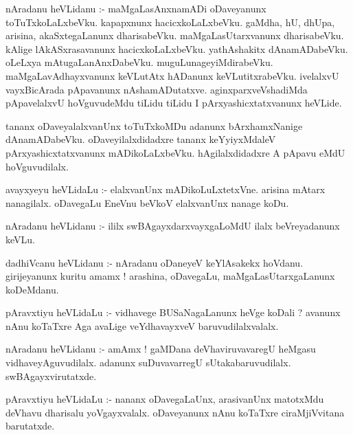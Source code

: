 \documentclass{article}
\begin{document}
\begin{mn}
nAradanu  heVLidanu :- maMgaLasAnxnamADi  oDaveyanunx  toTuTxkoLaLxbeVku.  kapapxnunx  hacicxkoLaLxbeVku.  gaMdha,  
hU,  dhUpa,  arisina,  akaSxtegaLanunx  dharisabeVku.  maMgaLasUtarxvanunx  dharisabeVku.  kAlige  lAkASxrasavanunx  
hacicxkoLaLxbeVku.  yathAshakitx  dAnamADabeVku.  oLeLxya  mAtugaLanAnxDabeVku.  muguLunageyiMdirabeVku.  maMgaLavAdhayxvanunx  
keVLutAtx  hADanunx  keVLutitxrabeVku.  ivelalxvU  vayxBicArada  pApavanunx  nAshamADutatxve.  aginxparxveVshadiMda  pApavelalxvU  
hoVguvudeMdu  tiLidu  tiLidu  I  pArxyashicxtatxvanunx  heVLide.                                                                                                
\end{mn}

\begin{mn}
tananx  oDaveyalalxvanUnx  toTuTxkoMDu  adanunx  bArxhamxNanige  dAnamADabeVku.  oDaveyilalxdidadxre  tananx  
keYyiyxMdaleV  pArxyashicxtatxvanunx  mADikoLaLxbeVku.  hAgilalxdidadxre  A  pApavu  eMdU  hoVguvudilalx.
\end{mn}

\begin{mn}
avayxyeyu  heVLidaLu :- elalxvanUnx  mADikoLuLxtetxVne.  arisina  mAtarx  nanagilalx.  oDavegaLu  EneVnu  beVkoV  
elalxvanUnx  nanage  koDu. 
\end{mn}

\begin{mn}
nAradanu  heVLidanu :- ililx  swBAgayxdarxvayxgaLoMdU  ilalx  beVreyadanunx  keVLu.
\end{mn}

\begin{mn}
dadhiVcanu  heVLidanu :- nAradanu  oDaneyeV  keYlAsakekx  hoVdanu.  girijeyanunx  kuritu  amamx !  
arashina,  oDavegaLu,  maMgaLasUtarxgaLanunx  koDeMdanu.
\end{mn}

\begin{mn}
pAravxtiyu  heVLidaLu :- vidhavege  BUSaNagaLanunx  heVge  koDali ?  avanunx  nAnu  koTaTxre  
Aga  avaLige  veYdhavayxveV  baruvudilalxvalalx. 
\end{mn}

\begin{mn}
nAradanu  heVLidanu :- amAmx !  gaMDana  deVhaviruvavaregU  heMgasu  vidhaveyAguvudilalx.  adanunx  
suDuvavarregU  sUtakabaruvudilalx.  swBAgayxvirutatxde.
\end{mn}

\begin{mn}
pAravxtiyu  heVLidaLu :- nananx  oDavegaLaUnx,  arasivanUnx  matotxMdu  deVhavu  dharisalu  yoVgayxvalalx.  
oDaveyanunx  nAnu  koTaTxre  ciraMjiVvitana  barutatxde.
\end{mn}
\end{document}
